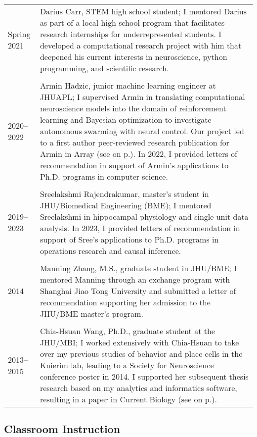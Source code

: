 \documentclass[10pt]{article}
\newcommand{\nameonpdot}[1]{\textcolor{hopkinsblue}{\emph{\nameref{sec:#1}} on p.\pageref{sec:#1}}}
\begin{document}
\begin{longtable}{@{\hspace{0.2in}}l>{\raggedright\arraybackslash}p{}}
  Spring 2021 \hspace{0.05in} & Darius Carr, STEM high school student; I mentored
  Darius as part of a local high school program that facilitates research
  internships for underrepresented students. I developed a computational
  research project with him that deepened his current interests in neuroscience,
  python programming, and scientific research. \\
  \tabularnewline
  2020--2022 \hspace{0.1in} & Armin Hadzic, junior machine learning engineer
  at JHUAPL; I supervised Armin in translating computational neuroscience
  models into the domain of reinforcement learning and Bayesian optimization
  to investigate autonomous swarming with neural control. Our project led to
  a first author peer-reviewed research publication for Armin in Array (see
  \nameonpdot{hadzicpub}). In 2022, I provided letters of recommendation in
  support of Armin's applications to Ph.D. programs in computer science. \\
  \tabularnewline
  2019--2023 & Sreelakshmi Rajendrakumar, master's student in JHU/Biomedical
  Engineering (BME); I mentored Sreelakshmi in hippocampal physiology and
  single-unit data analysis. In 2023, I provided letters of recommendation in
  support of Sree's applications to Ph.D. programs in operations research and
  causal inference. \\
  \tabularnewline
  2014 & Manning Zhang, M.S., graduate student in JHU/BME; I mentored Manning
  through an exchange program with Shanghai Jiao Tong University and submitted
  a letter of recommendation supporting her admission to the JHU/BME master's
  program. \\
  \tabularnewline
  2013--2015 & Chia-Hsuan Wang, Ph.D., graduate student at the JHU/MBI; I worked
  extensively with Chia-Hsuan to take over my previous studies of behavior
  and place cells in the Knierim lab, leading to a Society for Neuroscience
  conference poster in 2014. I supported her subsequent thesis research based on
  my analytics and informatics software, resulting in a paper in Current Biology
  (see \nameonpdot{wangpub}). \\
\end{longtable}


\subsection*{Classroom Instruction}
\end{document}
